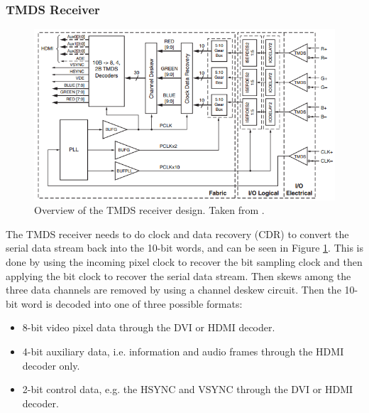 \subsubsection{TMDS Receiver}
\begin{figure}[h!]
    \centering
    \includegraphics[width=\linewidth]{img/TMDSreceiverdesign.png}
    \caption{Overview of the TMDS receiver design. Taken from \cite{xapp495}.}
    \label{fig:TMDSReceiver}
\end{figure}
The TMDS receiver needs to do clock and data recovery (CDR) to convert the serial data stream back into the 10-bit words, and can be seen in Figure \ref{fig:TMDSReceiver}.
This is done by using the incoming pixel clock to recover the bit sampling clock and then applying the bit clock to recover the serial data stream.
Then skews among the three data channels are removed by using a channel deskew circuit.
Then the 10-bit word is decoded into one of three possible formats:
\begin{itemize}
    \item   8-bit video pixel data through the DVI or HDMI decoder.
    \item   4-bit auxiliary data, i.e. information and audio frames through the HDMI decoder only.
    \item   2-bit control data, e.g. the HSYNC and VSYNC through the DVI or HDMI decoder.
\end{itemize}

